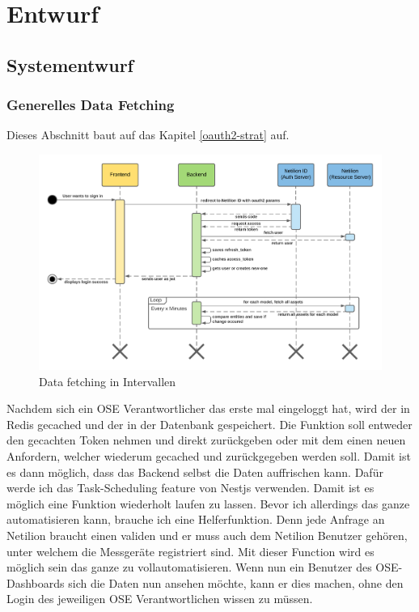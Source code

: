 
\chapter{Entwurf}
\section{Systementwurf}
\subsection{Generelles Data Fetching} \label{data-fetching}
Dieses Abschnitt baut auf das Kapitel \ref{oauth2-strat} auf.
\begin{figure}[!ht]
  \centering
  \includegraphics[width=.95\linewidth]{./images/datafetching.png}
  \caption[{Sequenzdiagram, welches das automatische fetching Erklärt}]{Data fetching in Intervallen}
  \label{fig:data-fetching}
\end{figure}
Nachdem sich ein OSE Verantwortlicher das erste mal eingeloggt hat, wird der  in Redis gecached und der  in der Datenbank gespeichert. Die Funktion soll entweder den gecachten Token nehmen und direkt zurückgeben oder mit dem  einen neuen Anfordern, welcher wiederum gecached und zurückgegeben werden soll. Damit ist es dann möglich, dass das Backend selbst die Daten auffrischen kann. Dafür werde ich das Task-Scheduling\cite{a2021_documentation} feature von Nestjs verwenden. Damit ist es möglich eine Funktion wiederholt laufen zu lassen.
\newline
Bevor ich allerdings das ganze automatisieren kann, brauche ich eine Helferfunktion. Denn jede Anfrage an Netilion braucht einen validen  und er muss auch dem Netilion Benutzer gehören, unter welchem die Messgeräte registriert sind. Mit dieser Function wird es möglich sein das ganze zu vollautomatisieren. Wenn nun ein Benutzer des OSE-Dashboards sich die Daten nun ansehen möchte, kann er dies machen, ohne den Login des jeweiligen OSE Verantwortlichen wissen zu müssen.
\pagebreak
